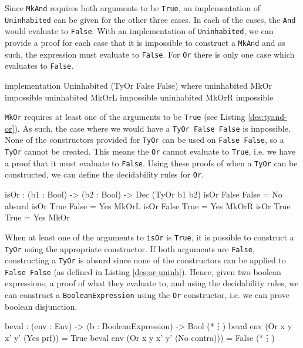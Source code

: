    Since \texttt{MkAnd} requires both arguments to be \texttt{True}, an implementation of \texttt{Uninhabited} can be given for the other three cases. In each of the cases, the \texttt{And} would evaluate to \texttt{False}. With an implementation of \texttt{Uninhabited}, we can provide a proof for each case that it is impossible to construct a \texttt{MkAnd} and as such, the expression must evaluate to \texttt{False}. For \texttt{Or} there is only one case which evaluates to \texttt{False}.
    
    \begin{code}[label={des:or-uninh}, caption={The impossible \texttt{Or} case}]
        implementation Uninhabited (TyOr False False) where
            uninhabited MkOr  impossible
            uninhabited MkOrL impossible
            uninhabited MkOrR impossible
    \end{code}

    \texttt{MkOr} requires at least one of the arguments to be \texttt{True} (see Listing \ref{des:tyand-or}). As such, the case where we would have a \texttt{TyOr False False} is impossible. None of the constructors provided for \texttt{TyOr} can be used on \texttt{False False}, so a \texttt{TyOr} cannot be created. This means the \texttt{Or} cannot evaluate to \texttt{True}, i.e. we have a proof that it must evaluate to \texttt{False}. Using these proofs of when a \texttt{TyOr} can be constructed, we can define the decidability rules for \texttt{Or}.
    
    \begin{code}[caption={Decidability rules for \texttt{Or}}]
        isOr : (b1 : Bool) -> (b2 : Bool) -> Dec (TyOr b1 b2)
        isOr False False = No absurd
        isOr True False  = Yes MkOrL
        isOr False True  = Yes MkOrR
        isOr True True   = Yes MkOr
    \end{code}
    
    When at least one of the arguments to \texttt{isOr} is \texttt{True}, it is possible to construct a \texttt{TyOr} using the appropriate constructor. If both arguments are \texttt{False}, constructing a \texttt{TyOr} is absurd since none of the constructors can be applied to \texttt{False False} (as defined in Listing \ref{des:or-uninh}). Hence, given two boolean expressions, a proof of what they evaluate to, and using the decidability rules, we can construct a \texttt{BooleanExpression} using the \texttt{Or} constructor, i.e. we can prove boolean disjunction.
    
    \begin{code}[caption={Evaluating \texttt{Or} over an environment}, escapeinside={(*}{*)}]
        beval : (env : Env) -> (b : BooleanExpression) -> Bool
        (*\vdots*)
        beval env (Or x y x' y' (Yes prf))    = True
        beval env (Or x y x' y' (No contra))) = False
        (*\vdots*)
    \end{code}


